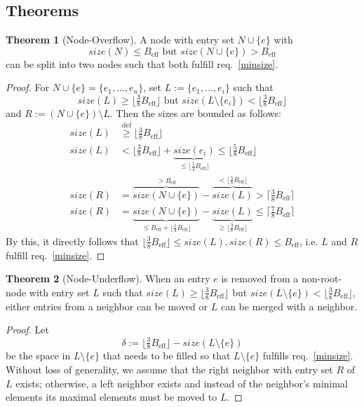 \documentclass[a4paper, 8pt]{scrartcl}
\theoremstyle{plain}
\theoremstyle{definition}
\newtheorem{thm}{Theorem}[section]
\theoremstyle{remark}
\newcommand \Beff { B_{\text{eff}} }
\begin{document}
\begin{multicols}{2}
\section{Theorems} %

\begin{thm}[Node-Overflow]
A node with entry set \mbox{$N \cup \{ e \}$} with
\[ size(N) \leq \Beff \text{ but } size(N \cup \{e\}) > \Beff \]
can be split into two nodes such that both fulfill req.~\ref{minsize}.

\begin{proof}
For \mbox{$N \cup \{e\} = \{ e_1, \ldots, e_n \}$}, set
\mbox{$L := \{ e_1, \ldots, e_i \}$} such that
\[ size(L) \geq \lfloor \tfrac{3}{8} \Beff \rfloor \text{ but }
	size(L \setminus \{e_i\}) < \lfloor \tfrac{3}{8} \Beff \rfloor \]
and \mbox{$R := (N \cup \{e\}) \setminus L$}.
Then the sizes are bounded as follows:
\begin{align*}
size(L) &\stackrel{\mathrm{def}}{\geq} \lfloor \tfrac{3}{8} \Beff \rfloor\\
size(L) &< \lfloor \tfrac{3}{8} \Beff \rfloor
		+ \underbrace{size(e_i)}_{\leq \lfloor \frac{1}{4} \Beff \rfloor}
	\leq \lfloor \tfrac{5}{8} \Beff \rfloor\\
size(R) &= \overbrace{size(N \cup \{e\})}^{> \Beff}
		- \overbrace{size(L)}^{< \lfloor \frac{5}{8} \Beff \rfloor}
	> \lceil \tfrac{3}{8} \Beff \rceil\\
size(R) &= \underbrace{size(N \cup \{e\})}_{
			\leq \Beff + \lfloor \frac{1}{4} \Beff \rfloor}
		- \underbrace{size(L)}_{\geq \lfloor \frac{3}{8} \Beff \rfloor}
	\leq \lceil \tfrac{7}{8} \Beff \rceil
\end{align*}
By this, it directly follows that 
\mbox{$\lfloor \tfrac{3}{8} \Beff \rfloor \leq size(L), size(R) \leq \Beff$}, 
i.e.  $L$ and $R$ fulfill req.~\ref{minsize}.
\end{proof}
\end{thm}


\begin{thm}[Node-Underflow]
When an entry $e$ is removed from a non-root-node with entry set $L$ such that 
$size(L) \geq \lfloor \tfrac{3}{8} \Beff \rfloor$ but
$size(L \setminus \{e\}) < \lfloor \tfrac{3}{8} \Beff \rfloor$, either entries
from a neighbor can be moved or $L$ can be merged with a neighbor.

\begin{proof}
Let \[\delta := \lfloor \tfrac{3}{8} \Beff \rfloor - size(L \setminus \{e\})\]
be the space in \mbox{$L \setminus \{e\}$} that needs to be filled so that
\mbox{$L \setminus \{e\}$} fulfills req.~\ref{minsize}.
Without loss of generality, we assume that the right neighbor with entry set $R$
of $L$ exists; otherwise, a left neighbor exists and instead of the neighbor's
minimal elements its maximal elements must be moved to $L$.


\end{proof}
\end{thm}
\end{multicols}
\end{document}
